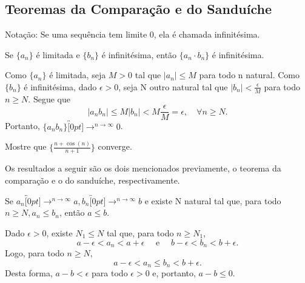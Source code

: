 \documentclass[Analysis/analysis_notes.tex]{subfiles}
\begin{document}
\subsection{Teoremas da Compara\c c\~ao e do Sandu\'iche}
Nota\c c\~ao: Se uma sequ\^encia tem limite 0, ela \'e chamada infinit\'esima.
\begin{theorem*}
	Se $\{a_{n}\}$ \'e limitada e $\{b_{n}\}$ \'e infinit\'esima, ent\~ao $\{a_{n}\cdot b_{n}\} $ \'e infinit\'esima.
\end{theorem*}
\begin{proof*}
	Como $\{a_{n}\}$ \'e limitada, seja $M > 0$ tal que $|a_{n}|\leq{M}$ para todo n natural. Como $\{b_{n}\} $ \'e infinit\'esima, dado $\epsilon > 0$,
	seja N outro natural tal que $|b_{n}|<\frac{\epsilon}{M}$ para todo $n\geq{N}.$ Segue que
	$$
		|a_{n}b_{n}| \leq{M|b_{n}|} < M \frac{\epsilon}{M} = \epsilon,\quad \forall n\geq{N}.
	$$
	Portanto, $\{a_{n}b_{n}\}\overbracket[0pt]{\longrightarrow}^{n\to \infty}0$.\qedsymbol
\end{proof*}
\begin{example}
	Mostre que $\biggl\{\frac{n+\cos{(n)}}{n+1}\biggr\}$ converge.
\end{example}
Os resultados a seguir s\~ao os dois mencionados previamente, o teorema da compara\c c\~ao e o do sandu\'iche, respectivamente.
\begin{theorem*}
	Se $a_{n}\overbracket[0pt]{\longrightarrow}^{n\to \infty}a, b_{n}\overbracket[0pt]{\longrightarrow}^{n\to \infty}b$ e existe N natural tal que,
	para todo $n\geq{N}, a_{n}\leq{b_{n}}$, ent\~ao $a\leq{b}.$
\end{theorem*}
\begin{proof*}
	Dado $\epsilon > 0$, existe $N_{1}\leq{N}$ tal que, para todo $n\geq{N_{1}}$,
	$$
		a - \epsilon < a_{n} < a + \epsilon\quad\text{ e }\quad b-\epsilon < b_{n} < b + \epsilon.
	$$
	Logo, para todo $n\geq{N},$
	$$
		a-\epsilon < a_{n} \leq{b_{n}} < b + \epsilon.
	$$
	Desta forma, $a-b < \epsilon$ para todo $\epsilon > 0$ e, portanto, $a - b\leq{0}.$\qedsymbol
\end{proof*}
\end{document}

